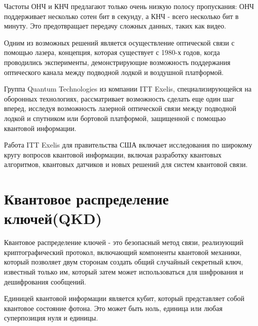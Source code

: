 \documentclass[a4paper,12pt]{article} %
\begin{document}
Частоты ОНЧ и КНЧ предлагают только очень низкую полосу пропускания: ОНЧ поддерживает несколько сотен бит в секунду, а КНЧ - всего несколько бит в минуту. Это предотвращает передачу сложных данных, таких как видео.

Одним из возможных решений является осуществление оптической связи с помощью лазера, концепция, которая существует с 1980-х годов, когда проводились эксперименты, демонстрирующие возможность поддержания оптического канала между подводной лодкой и воздушной платформой.

Группа Quantum Technologies из компании ITT Exelis, специализирующейся на оборонных технологиях, рассматривает возможность сделать еще один шаг вперед, исследуя возможность лазерной оптической связи между подводной лодкой и спутником или бортовой платформой, защищенной с помощью квантовой информации.

Работа ITT Exelis для правительства США включает исследования по широкому кругу вопросов квантовой информации, включая разработку квантовых алгоритмов, квантовых датчиков и новых решений для систем квантовой связи.

\section*{Квантовое распределение ключей(QKD)}

\hspace{13pt} Квантовое распределение ключей - это безопасный метод связи, реализующий криптографический протокол, включающий компоненты квантовой механики, который позволяет двум сторонам создать общий случайный секретный ключ, известный только им, который затем может использоваться для шифрования и дешифрования сообщений.

Единицей квантовой информации является кубит, который представляет собой квантовое состояние фотона. Это может быть ноль, единица или любая суперпозиция нуля и единицы.

~\\~

\noindent%
\begin{minipage}{\linewidth}%
\label{SVM}%
\end{minipage}
\end{document}
